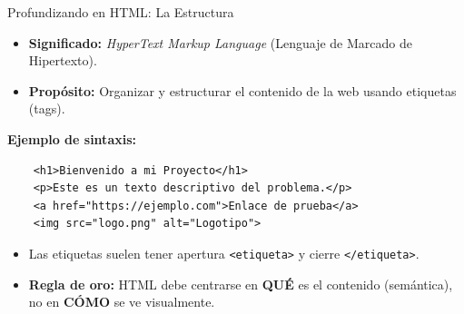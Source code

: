 \documentclass{beamer}
\begin{document}
\begin{frame}[fragile]{Profundizando en HTML: La Estructura}
    \begin{itemize}
        \item \textbf{Significado:} \textit{HyperText Markup Language} (Lenguaje de Marcado de Hipertexto).
        \item \textbf{Propósito:} Organizar y estructurar el contenido de la web usando etiquetas (tags).
    \end{itemize}
    
    \vspace{0.3cm}
    \textbf{Ejemplo de sintaxis:}
    \begin{verbatim}
    <h1>Bienvenido a mi Proyecto</h1>
    <p>Este es un texto descriptivo del problema.</p>
    <a href="https://ejemplo.com">Enlace de prueba</a>
    <img src="logo.png" alt="Logotipo">
    \end{verbatim}
    
    \vspace{0.3cm}
    \begin{itemize}
        \item Las etiquetas suelen tener apertura \verb|<etiqueta>| y cierre \verb|</etiqueta>|.
        \item \textbf{Regla de oro:} HTML debe centrarse en \textbf{QUÉ} es el contenido (semántica), no en \textbf{CÓMO} se ve visualmente.
    \end{itemize}
\end{frame}
\end{document}
